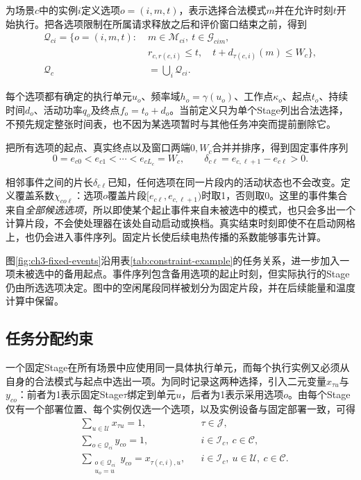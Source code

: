 \noindent 为场景$c$中的实例$i$定义选项$o=(i,m,t)$，表示选择合法模式$m$并在允许时刻$t$开始执行。把各选项限制在所属请求释放之后和评价窗口结束之前，得到
\begin{equation}
\begin{aligned}
\mathcal Q_{ci}=\{o=(i,m,t):\;&m\in\mathcal M_{ci},\ t\in\mathcal G_{cim},\\
&r_{c,r(c,i)}\le t,\quad t+d_{\tau(c,i)}(m)\le W_c\},\\
\mathcal Q_c&=\bigcup_i\mathcal Q_{ci}.
\end{aligned}
\label{eq:options}
\end{equation}

每个选项都有确定的执行单元$u_o$、频率域$h_o=\gamma(u_o)$、工作点$\kappa_o$、起点$t_o$、持续时间$d_o$、活动功率$q_o$及终点$f_o=t_o+d_o$。当前定义只为单个Stage列出合法选择，不预先规定整张时间表，也不因为某选项暂时与其他任务冲突而提前删除它。

把所有选项的起点、真实终点以及窗口两端$0,W_c$合并并排序，得到固定事件序列
\begin{equation}
0=e_{c0}<e_{c1}<\cdots<e_{cL_c}=W_c,\qquad
\delta_{c\ell}=e_{c,\ell+1}-e_{c\ell}>0.
\label{eq:events}
\end{equation}

相邻事件之间的片长$\delta_{c\ell}$已知，任何选项在同一片段内的活动状态也不会改变。定义覆盖系数$\chi_{co\ell}$：选项$o$覆盖片段$[e_{c\ell},e_{c,\ell+1})$时取1，否则取0。这里的事件集合来自\emph{全部候选选项}，所以即使某个起止事件来自未被选中的模式，也只会多出一个计算片段，不会使处理器在该处自动启动或换档。真实结束时刻即使不在启动网格上，也仍会进入事件序列。固定片长使后续电热传播的系数能够事先计算。

图\ref{fig:ch3-fixed-events}沿用表\ref{tab:constraint-example}的任务关系，进一步加入一项未被选中的备用起点。事件序列包含备用选项的起止时刻，但实际执行的Stage仍由所选选项决定。图中的空闲尾段同样被划分为固定片段，并在后续能量和温度计算中保留。



\subsection{任务分配约束}

一个固定Stage在所有场景中应使用同一具体执行单元，而每个执行实例又必须从自身的合法模式与起点中选出一项。为同时记录这两种选择，引入二元变量$x_{\tau u}$与$y_{co}$：前者为1表示固定Stage$\tau$绑定到单元$u$，后者为1表示采用选项$o$。由每个Stage仅有一个部署位置、每个实例仅选一个选项，以及实例设备与固定部署一致，可得
\begin{equation}
\begin{aligned}
&\sum_{u\in\mathcal U}x_{\tau u}=1,
&&\tau\in\mathcal J,\\
&\sum_{o\in\mathcal Q_{ci}}y_{co}=1,
&&i\in\mathcal I_c,\ c\in\mathcal C,\\
&\sum_{\substack{o\in\mathcal Q_{ci}\\u_o=u}}y_{co}=x_{\tau(c,i),u},
&&i\in\mathcal I_c,\ u\in\mathcal U,\ c\in\mathcal C.
\end{aligned}
\label{eq:milp-assignment}
\end{equation}

